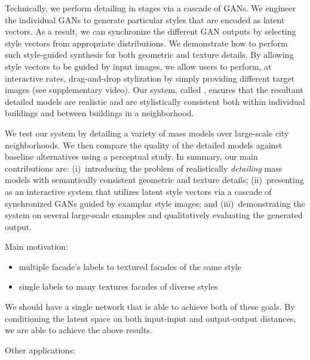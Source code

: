 

Technically, we perform detailing in stages via a cascade of GANs. We engineer the individual GANs to generate particular styles that are encoded as latent vectors. As a result, we can synchronize the different GAN outputs by selecting style vectors from appropriate distributions. We demonstrate how to perform such style-guided synthesis for both geometric and texture details. By allowing style vectors to be guided by input images, we allow users to perform, at interactive rates, drag-and-drop stylization by simply providing  different target images  (see supplementary video).  
Our system, called \systemName, ensures that the resultant detailed models are realistic and are stylistically consistent both within individual buildings and between buildings in a neighborhood. 
 


We test our system by detailing a variety of mass models over large-scale city neighborhoods. We then compare the quality of the detailed models against baseline alternatives using a perceptual study. In summary, our main contributions are: 
(i)~introducing the problem of realistically {\em detailing} mass models with semantically consistent geometric and texture details; 
(ii)~presenting \systemName as an interactive system that utilizes latent style vectors via a cascade of synchronized GANs guided by examplar style images; and 
(iii)~demonstrating the system on several large-scale examples and qualitatively evaluating the generated output.
%





Main motivation:
\begin{itemize}
    \item multiple facade's labels to textured facades of the same style
    \item single labels to many textures facades of diverse styles
\end{itemize}

We should have a single network that is able to achieve both of these goals. By conditioning the latent space on both input-input and output-output distances, we are able to achieve the above results.

Other applications:

